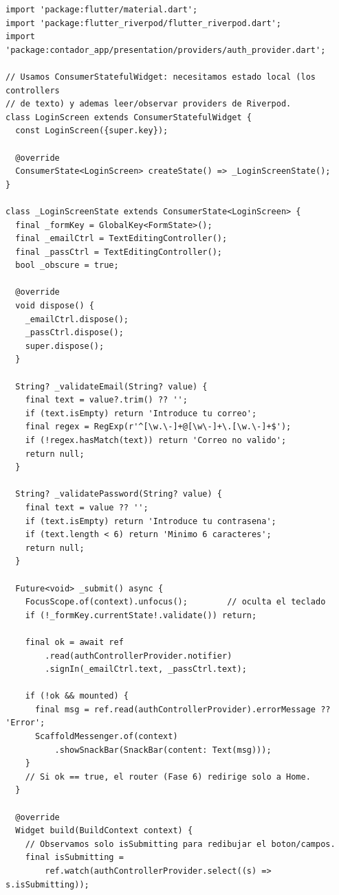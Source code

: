\documentclass[11pt,a4paper,oneside]{book}
\begin{document}
\begin{lstlisting}
import 'package:flutter/material.dart';
import 'package:flutter_riverpod/flutter_riverpod.dart';
import 'package:contador_app/presentation/providers/auth_provider.dart';

// Usamos ConsumerStatefulWidget: necesitamos estado local (los controllers
// de texto) y ademas leer/observar providers de Riverpod.
class LoginScreen extends ConsumerStatefulWidget {
  const LoginScreen({super.key});

  @override
  ConsumerState<LoginScreen> createState() => _LoginScreenState();
}

class _LoginScreenState extends ConsumerState<LoginScreen> {
  final _formKey = GlobalKey<FormState>();
  final _emailCtrl = TextEditingController();
  final _passCtrl = TextEditingController();
  bool _obscure = true;

  @override
  void dispose() {
    _emailCtrl.dispose();
    _passCtrl.dispose();
    super.dispose();
  }

  String? _validateEmail(String? value) {
    final text = value?.trim() ?? '';
    if (text.isEmpty) return 'Introduce tu correo';
    final regex = RegExp(r'^[\w.\-]+@[\w\-]+\.[\w.\-]+$');
    if (!regex.hasMatch(text)) return 'Correo no valido';
    return null;
  }

  String? _validatePassword(String? value) {
    final text = value ?? '';
    if (text.isEmpty) return 'Introduce tu contrasena';
    if (text.length < 6) return 'Minimo 6 caracteres';
    return null;
  }

  Future<void> _submit() async {
    FocusScope.of(context).unfocus();        // oculta el teclado
    if (!_formKey.currentState!.validate()) return;

    final ok = await ref
        .read(authControllerProvider.notifier)
        .signIn(_emailCtrl.text, _passCtrl.text);

    if (!ok && mounted) {
      final msg = ref.read(authControllerProvider).errorMessage ?? 'Error';
      ScaffoldMessenger.of(context)
          .showSnackBar(SnackBar(content: Text(msg)));
    }
    // Si ok == true, el router (Fase 6) redirige solo a Home.
  }

  @override
  Widget build(BuildContext context) {
    // Observamos solo isSubmitting para redibujar el boton/campos.
    final isSubmitting =
        ref.watch(authControllerProvider.select((s) => s.isSubmitting));


\end{lstlisting}
\end{document}
